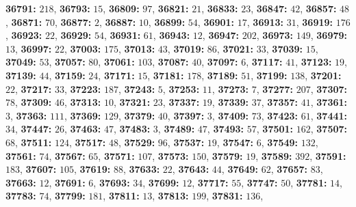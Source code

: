 \textsf{\bfseries 36791:} $218$, \textsf{\bfseries 36793:} $15$, \textsf{\bfseries 36809:} $97$, \textsf{\bfseries 36821:} $21$, \textsf{\bfseries 36833:} $23$, \textsf{\bfseries 36847:} $42$, \textsf{\bfseries 36857:} $48$, \textsf{\bfseries 36871:} $70$, \textsf{\bfseries 36877:} $2$, \textsf{\bfseries 36887:} $10$, \textsf{\bfseries 36899:} $54$, \textsf{\bfseries 36901:} $17$, \textsf{\bfseries 36913:} $31$, \textsf{\bfseries 36919:} $176$, \textsf{\bfseries 36923:} $22$, \textsf{\bfseries 36929:} $54$, \textsf{\bfseries 36931:} $61$, \textsf{\bfseries 36943:} $12$, \textsf{\bfseries 36947:} $202$, \textsf{\bfseries 36973:} $149$, \textsf{\bfseries 36979:} $13$, \textsf{\bfseries 36997:} $22$, \textsf{\bfseries 37003:} $175$, \textsf{\bfseries 37013:} $43$, \textsf{\bfseries 37019:} $86$, \textsf{\bfseries 37021:} $33$, \textsf{\bfseries 37039:} $15$, \textsf{\bfseries 37049:} $53$, \textsf{\bfseries 37057:} $80$, \textsf{\bfseries 37061:} $103$, \textsf{\bfseries 37087:} $40$, \textsf{\bfseries 37097:} $6$, \textsf{\bfseries 37117:} $41$, \textsf{\bfseries 37123:} $19$, \textsf{\bfseries 37139:} $44$, \textsf{\bfseries 37159:} $24$, \textsf{\bfseries 37171:} $15$, \textsf{\bfseries 37181:} $178$, \textsf{\bfseries 37189:} $51$, \textsf{\bfseries 37199:} $138$, \textsf{\bfseries 37201:} $22$, \textsf{\bfseries 37217:} $33$, \textsf{\bfseries 37223:} $187$, \textsf{\bfseries 37243:} $5$, \textsf{\bfseries 37253:} $11$, \textsf{\bfseries 37273:} $7$, \textsf{\bfseries 37277:} $207$, \textsf{\bfseries 37307:} $78$, \textsf{\bfseries 37309:} $46$, \textsf{\bfseries 37313:} $10$, \textsf{\bfseries 37321:} $23$, \textsf{\bfseries 37337:} $19$, \textsf{\bfseries 37339:} $37$, \textsf{\bfseries 37357:} $41$, \textsf{\bfseries 37361:} $3$, \textsf{\bfseries 37363:} $111$, \textsf{\bfseries 37369:} $129$, \textsf{\bfseries 37379:} $40$, \textsf{\bfseries 37397:} $3$, \textsf{\bfseries 37409:} $73$, \textsf{\bfseries 37423:} $61$, \textsf{\bfseries 37441:} $34$, \textsf{\bfseries 37447:} $26$, \textsf{\bfseries 37463:} $47$, \textsf{\bfseries 37483:} $3$, \textsf{\bfseries 37489:} $47$, \textsf{\bfseries 37493:} $57$, \textsf{\bfseries 37501:} $162$, \textsf{\bfseries 37507:} $68$, \textsf{\bfseries 37511:} $124$, \textsf{\bfseries 37517:} $48$, \textsf{\bfseries 37529:} $96$, \textsf{\bfseries 37537:} $19$, \textsf{\bfseries 37547:} $6$, \textsf{\bfseries 37549:} $132$, \textsf{\bfseries 37561:} $74$, \textsf{\bfseries 37567:} $65$, \textsf{\bfseries 37571:} $107$, \textsf{\bfseries 37573:} $150$, \textsf{\bfseries 37579:} $19$, \textsf{\bfseries 37589:} $392$, \textsf{\bfseries 37591:} $183$, \textsf{\bfseries 37607:} $105$, \textsf{\bfseries 37619:} $88$, \textsf{\bfseries 37633:} $22$, \textsf{\bfseries 37643:} $44$, \textsf{\bfseries 37649:} $62$, \textsf{\bfseries 37657:} $83$, \textsf{\bfseries 37663:} $12$, \textsf{\bfseries 37691:} $6$, \textsf{\bfseries 37693:} $34$, \textsf{\bfseries 37699:} $12$, \textsf{\bfseries 37717:} $55$, \textsf{\bfseries 37747:} $50$, \textsf{\bfseries 37781:} $14$, \textsf{\bfseries 37783:} $74$, \textsf{\bfseries 37799:} $181$, \textsf{\bfseries 37811:} $13$, \textsf{\bfseries 37813:} $199$, \textsf{\bfseries 37831:} $136$, 
